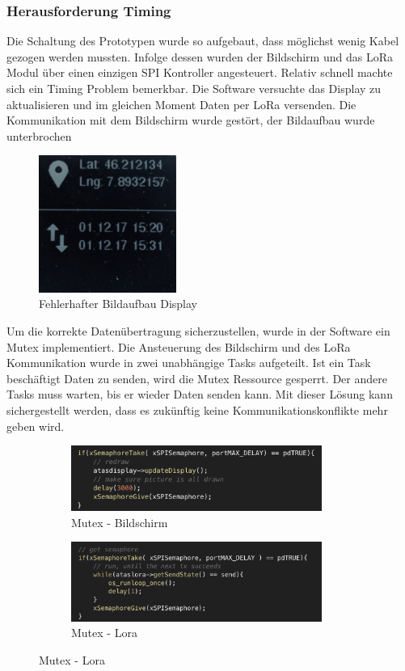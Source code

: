 \documentclass[11pt,english,german]{report}
\theoremstyle{definition}
\begin{document}
\subsubsection{Herausforderung Timing}
Die Schaltung des Prototypen wurde  so aufgebaut, dass möglichst wenig Kabel gezogen werden mussten. Infolge dessen wurden der Bildschirm  und das LoRa Modul über einen einzigen SPI Kontroller angesteuert. Relativ schnell machte sich ein Timing Problem bemerkbar. Die Software versuchte das Display zu aktualisieren und im gleichen Moment Daten per LoRa versenden. Die Kommunikation mit dem Bildschirm wurde gestört, der Bildaufbau wurde unterbrochen
\begin{figure}[H]
	\centering
	\includegraphics[width=0.4\textwidth]{img/prototype/display_updateissue.jpg}
	\caption[Fehlerhafter Bildaufbau Display]
	{Fehlerhafter Bildaufbau Display}
\end{figure}
\noindent
Um die korrekte Datenübertragung sicherzustellen, wurde in der Software ein Mutex implementiert. Die Ansteuerung des Bildschirm und des LoRa Kommunikation wurde in zwei unabhängige Tasks aufgeteilt. Ist ein Task beschäftigt Daten zu senden, wird die Mutex Ressource gesperrt. Der andere Tasks muss warten, bis er wieder Daten senden kann. Mit dieser Lösung kann sichergestellt werden, dass es zukünftig keine Kommunikationskonflikte mehr geben wird.
\begin{figure}[H]
	\centering
	\begin{subfigure}{.5\textwidth}
		\centering
		\includegraphics[width=0.9\textwidth]{img/prototype/displaymutex.png}
		\caption[Mutex - Bildschrim]
		{Mutex - Bildschirm}
	\end{subfigure}%
	\begin{subfigure}{.5\textwidth}
		\centering
		\includegraphics[width=0.9\textwidth]{img/prototype/loramutex.png}
		\caption[Mutex - Lora]
		{Mutex - Lora}
	\end{subfigure}%
\end{figure}
\newpage
\end{document}
